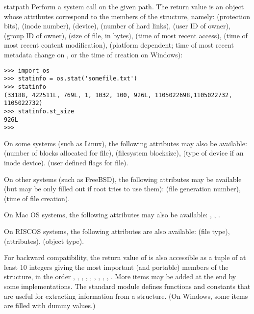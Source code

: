 \begin{funcdesc}{stat}{path}
Perform a  system call on the given path.  The
return value is an object whose attributes correspond to the members of
the  structure, namely:
 (protection bits),
 (inode number),
 (device),
 (number of hard links),
 (user ID of owner),
 (group ID of owner),
 (size of file, in bytes),
 (time of most recent access),
 (time of most recent content modification),
(platform dependent; time of most recent metadata change on \UNIX, or
the time of creation on Windows):

\begin{verbatim}
>>> import os
>>> statinfo = os.stat('somefile.txt')
>>> statinfo
(33188, 422511L, 769L, 1, 1032, 100, 926L, 1105022698,1105022732, 1105022732)
>>> statinfo.st_size
926L
>>>
\end{verbatim}


On some \UNIX{} systems (such as Linux), the following attributes may
also be available:
 (number of blocks allocated for file),
 (filesystem blocksize),
 (type of device if an inode device).
 (user defined flags for file).

On other \UNIX{} systems (such as FreeBSD), the following attributes
may be available (but may be only filled out if root tries to
use them):
 (file generation number),
 (time of file creation).

On Mac OS systems, the following attributes may also be available:
,
,
.

On RISCOS systems, the following attributes are also available:
 (file type),
 (attributes),
 (object type).

For backward compatibility, the return value of  is
also accessible as a tuple of at least 10 integers giving the most
important (and portable) members of the  structure, in the
order
,
,
,
,
,
,
,
,
,
.
More items may be added at the end by some implementations.
The standard module  defines
functions and constants that are useful for extracting information
from a  structure.
(On Windows, some items are filled with dummy values.)


\end{funcdesc}
